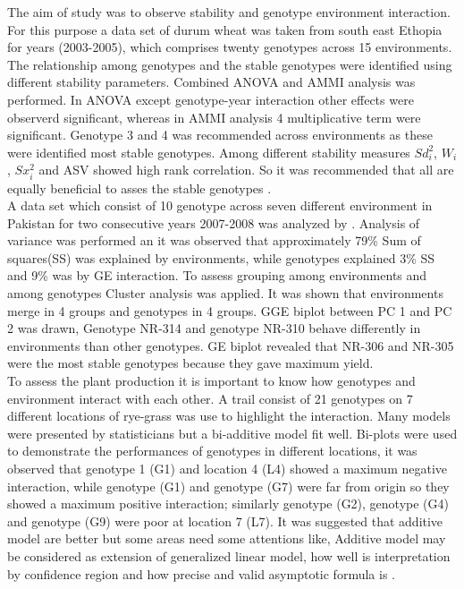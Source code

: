  The aim of study was to observe stability and genotype environment interaction. For this purpose a data set of durum wheat was taken from south east Ethopia for years (2003-2005), which comprises twenty genotypes across 15 environments. The relationship among genotypes and the stable genotypes were identified using different stability parameters. Combined ANOVA and AMMI analysis was performed. In ANOVA except genotype-year interaction  other effects were observerd significant, whereas in AMMI analysis 4 multiplicative term were significant. Genotype 3 and 4 was recommended across environments as these were identified most stable genotypes. Among different stability measures $Sd_i^2$, $W_i$, $Sx_i^2$ and ASV showed high rank correlation. So it was recommended that all are equally beneficial to asses the stable genotypes \citep{Lett2007}. \\
 
   A data set which consist of  10 genotype across seven different environment in Pakistan for two consecutive years 2007-2008 was analyzed by \citep{Mujahid2011}. Analysis of variance was performed an it was observed that approximately 79\% Sum of squares(SS) was explained by environments, while genotypes explained 3\% SS and 9\% was by GE interaction. To assess grouping among environments and among genotypes Cluster analysis was applied. It was shown that environments merge in 4 groups and genotypes in 4 groups. GGE biplot between PC 1 and PC 2 was drawn, Genotype NR-314 and genotype NR-310 behave differently in environments than other genotypes. GE biplot revealed that NR-306 and NR-305 were the most stable genotypes because they gave maximum yield. \\
   
  To assess the plant production it is important to know how genotypes and environment interact with each other. A trail consist of 21 genotypes on 7 different locations of rye-grass was use to highlight the interaction. Many models were presented by statisticians but a bi-additive model fit well. Bi-plots were used to demonstrate the performances of genotypes in different locations, it was observed that genotype 1 (G1) and location 4 (L4) showed a maximum negative interaction, while genotype (G1) and genotype (G7) were far from origin so they showed a maximum positive interaction; similarly genotype (G2), genotype (G4) and genotype (G9) were poor at location 7 (L7). It was suggested that additive model are better but some areas need some attentions like, Additive model may be considered as extension of generalized linear model, how well is interpretation by confidence region and how precise and valid asymptotic formula is \citep{Denis1996}. \\ 
 
